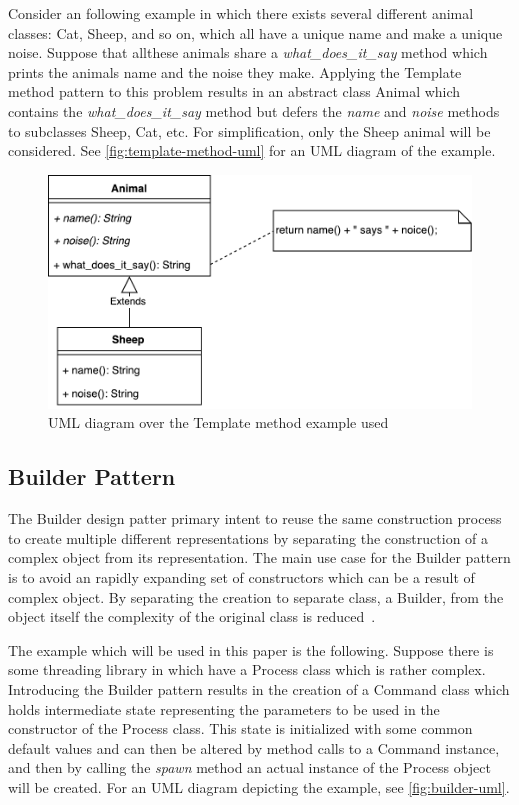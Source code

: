 \documentclass[conference]{IEEEtran}
\begin{document}
Consider an following example in which there exists several different animal classes: Cat, Sheep, and so on, which all have a unique name and make a unique noise.
Suppose that allthese animals share a \emph{what\_does\_it\_say} method which prints the animals name and the noise they make.
Applying the Template method pattern to this problem results in an abstract class Animal which contains the \emph{what\_does\_it\_say} method but defers the \emph{name} and \emph{noise} methods to subclasses Sheep, Cat, etc.
For simplification, only the Sheep animal will be considered.
See \autoref{fig:template-method-uml} for an UML diagram of the example.

\begin{figure}[htpb]
    \centering
    \includegraphics[width=0.8\linewidth]{template-method-ex.pdf}
    \caption{UML diagram over the Template method example used}
    \label{fig:template-method-uml}
\end{figure}

\subsection{Builder Pattern}
\label{sub:builder_pattern}

The Builder design patter primary intent to reuse the same construction process to create multiple different representations by separating the construction of a complex object from its representation.
The main use case for the Builder pattern is to avoid an rapidly expanding set of constructors which can be a result of complex object.
By separating the creation to separate class, a Builder, from the object itself the complexity of the original class is reduced~\cite{gamma1993:gof}.

The example which will be used in this paper is the following.
Suppose there is some threading library in which have a Process class which is rather complex.
Introducing the Builder pattern results in the creation of a Command class which holds intermediate state representing the parameters to be used in the constructor of the Process class.
This state is initialized with some common default values and can then be altered by method calls to a Command instance, and then by calling the \emph{spawn} method an actual instance of the Process object will be created.
For an UML diagram depicting the example, see \autoref{fig:builder-uml}.
\end{document}
